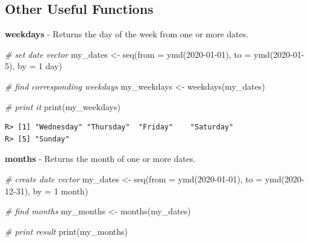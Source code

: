 \documentclass[
  12pt,
]{book}
\newenvironment{Shaded}{\begin{snugshade}}{\end{snugshade}}
\newcommand{\AttributeTok}[1]{\textcolor[rgb]{0.61,0.61,0.61}{#1}}
\newcommand{\CommentTok}[1]{\textcolor[rgb]{0.37,0.37,0.37}{\textit{#1}}}
\newcommand{\FunctionTok}[1]{\textcolor[rgb]{0,0,0}{#1}}
\newcommand{\NormalTok}[1]{#1}
\newcommand{\OtherTok}[1]{\textcolor[rgb]{0.37,0.37,0.37}{#1}}
\newcommand{\StringTok}[1]{\textcolor[rgb]{0.5,0.5,0.5}{#1}}
\begin{document}
\hypertarget{other-useful-functions-5}{%
\subsection{Other Useful Functions}\label{other-useful-functions-5}}

\textbf{weekdays} - Returns the day of the week from one or more dates. 

\begin{Shaded}
\begin{Highlighting}[]
\CommentTok{\# set date vector}
\NormalTok{my\_dates }\OtherTok{\textless{}{-}} \FunctionTok{seq}\NormalTok{(}\AttributeTok{from =} \FunctionTok{ymd}\NormalTok{(}\StringTok{\textquotesingle{}2020{-}01{-}01\textquotesingle{}}\NormalTok{),}
                \AttributeTok{to =} \FunctionTok{ymd}\NormalTok{(}\StringTok{\textquotesingle{}2020{-}01{-}5\textquotesingle{}}\NormalTok{),}
                \AttributeTok{by =} \StringTok{\textquotesingle{}1 day\textquotesingle{}}\NormalTok{)}

\CommentTok{\# find corresponding weekdays}
\NormalTok{my\_weekdays }\OtherTok{\textless{}{-}} \FunctionTok{weekdays}\NormalTok{(my\_dates)}

\CommentTok{\# print it}
\FunctionTok{print}\NormalTok{(my\_weekdays)}
\end{Highlighting}
\end{Shaded}

\begin{verbatim}
R> [1] "Wednesday" "Thursday"  "Friday"    "Saturday" 
R> [5] "Sunday"
\end{verbatim}

\textbf{months} - Returns the month of one or more dates. 

\begin{Shaded}
\begin{Highlighting}[]
\CommentTok{\# create date vector}
\NormalTok{my\_dates }\OtherTok{\textless{}{-}} \FunctionTok{seq}\NormalTok{(}\AttributeTok{from =} \FunctionTok{ymd}\NormalTok{(}\StringTok{\textquotesingle{}2020{-}01{-}01\textquotesingle{}}\NormalTok{),}
                \AttributeTok{to =} \FunctionTok{ymd}\NormalTok{(}\StringTok{\textquotesingle{}2020{-}12{-}31\textquotesingle{}}\NormalTok{),}
                \AttributeTok{by =} \StringTok{\textquotesingle{}1 month\textquotesingle{}}\NormalTok{)}

\CommentTok{\# find months}
\NormalTok{my\_months }\OtherTok{\textless{}{-}} \FunctionTok{months}\NormalTok{(my\_dates)}

\CommentTok{\# print result}
\FunctionTok{print}\NormalTok{(my\_months)}
\end{Highlighting}
\end{Shaded}
\end{document}
